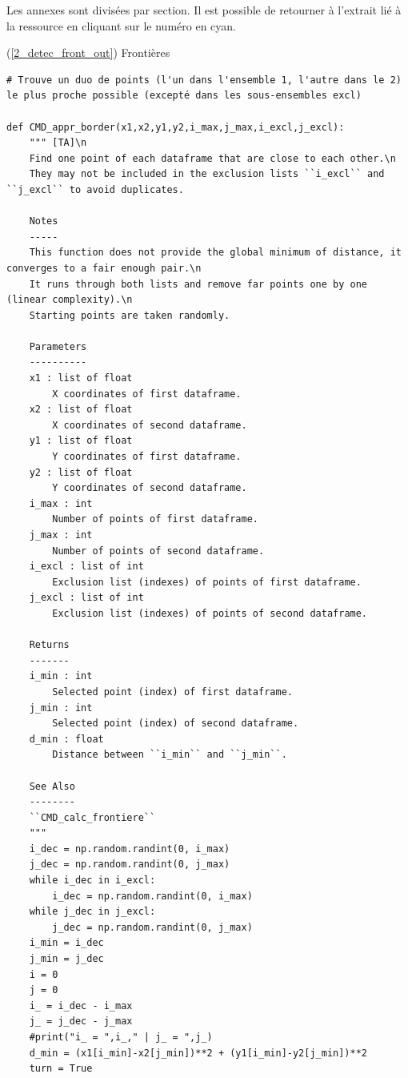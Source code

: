 \documentclass[12pt]{article}
\begin{document}
    Les annexes sont divisées par section. Il est possible de retourner à l'extrait lié à la ressource en cliquant sur le numéro en cyan.

    \label{2_detec_front_in} (\ref{2_detec_front_out}) Frontières
    
\begin{lstlisting}
# Trouve un duo de points (l'un dans l'ensemble 1, l'autre dans le 2) le plus proche possible (excepté dans les sous-ensembles excl)

def CMD_appr_border(x1,x2,y1,y2,i_max,j_max,i_excl,j_excl):
    """ [TA]\n
    Find one point of each dataframe that are close to each other.\n
    They may not be included in the exclusion lists ``i_excl`` and ``j_excl`` to avoid duplicates.
    
    Notes
    -----
    This function does not provide the global minimum of distance, it converges to a fair enough pair.\n
    It runs through both lists and remove far points one by one (linear complexity).\n
    Starting points are taken randomly.
    
    Parameters
    ----------
    x1 : list of float
        X coordinates of first dataframe.
    x2 : list of float
        X coordinates of second dataframe.
    y1 : list of float
        Y coordinates of first dataframe.
    y2 : list of float
        Y coordinates of second dataframe.
    i_max : int
        Number of points of first dataframe.
    j_max : int
        Number of points of second dataframe.
    i_excl : list of int
        Exclusion list (indexes) of points of first dataframe.
    j_excl : list of int
        Exclusion list (indexes) of points of second dataframe.
    
    Returns
    -------
    i_min : int
        Selected point (index) of first dataframe.
    j_min : int
        Selected point (index) of second dataframe.
    d_min : float
        Distance between ``i_min`` and ``j_min``.
    
    See Also
    --------
    ``CMD_calc_frontiere``
    """
    i_dec = np.random.randint(0, i_max)
    j_dec = np.random.randint(0, j_max)
    while i_dec in i_excl:
        i_dec = np.random.randint(0, i_max)
    while j_dec in j_excl:
        j_dec = np.random.randint(0, j_max)
    i_min = i_dec
    j_min = j_dec
    i = 0
    j = 0
    i_ = i_dec - i_max
    j_ = j_dec - j_max
    #print("i_ = ",i_," | j_ = ",j_)
    d_min = (x1[i_min]-x2[j_min])**2 + (y1[i_min]-y2[j_min])**2
    turn = True
    

\end{lstlisting}
\end{document}
